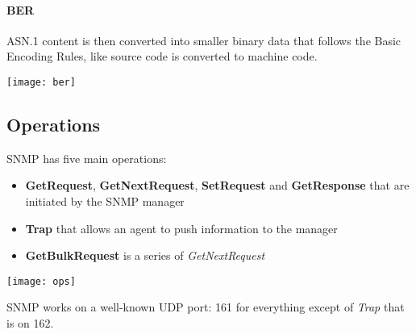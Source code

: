 \paragraph{BER}
ASN.1 content is then converted into smaller binary data that follows the Basic Encoding Rules, like source code is converted to machine code.
\begin{center}
	\texttt{[image: ber]}
\end{center}

\subsection{Operations}
SNMP has five main operations:
\begin{itemize}
	\item \textbf{GetRequest}, \textbf{GetNextRequest}, \textbf{SetRequest} and \textbf{GetResponse} that are initiated by the SNMP manager
	\item \textbf{Trap} that allows an agent to push information to the manager
	\item \textbf{GetBulkRequest} is a series of \textit{GetNextRequest}
\end{itemize}
\begin{center}
	\texttt{[image: ops]}
\end{center}
SNMP works on a well-known UDP port: 161 for everything except of \textit{Trap} that is on 162.

